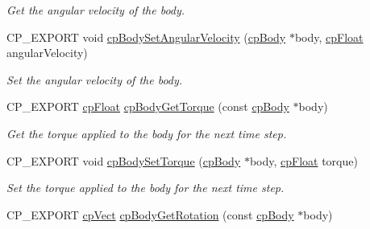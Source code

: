 \begin{DoxyCompactItemize}
\begin{DoxyCompactList}\small\item\em Get the angular velocity of the body. \end{DoxyCompactList}\item 
\mbox{\label{group__cp_body_gacc650639383006ae40657883b9ecf02d}} 
C\+P\+\_\+\+E\+X\+P\+O\+RT void \mbox{\hyperlink{group__cp_body_gacc650639383006ae40657883b9ecf02d}{cp\+Body\+Set\+Angular\+Velocity}} (\mbox{\hyperlink{structcp_body}{cp\+Body}} $\ast$body, \mbox{\hyperlink{group__basic_types_gac1ed65573e035bf892505768c852d8d3}{cp\+Float}} angular\+Velocity)
\begin{DoxyCompactList}\small\item\em Set the angular velocity of the body. \end{DoxyCompactList}\item 
\mbox{\label{group__cp_body_ga77bde17091dff1496e695fbba26037bb}} 
C\+P\+\_\+\+E\+X\+P\+O\+RT \mbox{\hyperlink{group__basic_types_gac1ed65573e035bf892505768c852d8d3}{cp\+Float}} \mbox{\hyperlink{group__cp_body_ga77bde17091dff1496e695fbba26037bb}{cp\+Body\+Get\+Torque}} (const \mbox{\hyperlink{structcp_body}{cp\+Body}} $\ast$body)
\begin{DoxyCompactList}\small\item\em Get the torque applied to the body for the next time step. \end{DoxyCompactList}\item 
\mbox{\label{group__cp_body_gade0bd4162880703b6e2f7a5de6a2fd0c}} 
C\+P\+\_\+\+E\+X\+P\+O\+RT void \mbox{\hyperlink{group__cp_body_gade0bd4162880703b6e2f7a5de6a2fd0c}{cp\+Body\+Set\+Torque}} (\mbox{\hyperlink{structcp_body}{cp\+Body}} $\ast$body, \mbox{\hyperlink{group__basic_types_gac1ed65573e035bf892505768c852d8d3}{cp\+Float}} torque)
\begin{DoxyCompactList}\small\item\em Set the torque applied to the body for the next time step. \end{DoxyCompactList}\item 
\mbox{\label{group__cp_body_ga064d1ba194075ebfe2b5aa45b56a800f}} 
C\+P\+\_\+\+E\+X\+P\+O\+RT \mbox{\hyperlink{structcp_vect}{cp\+Vect}} \mbox{\hyperlink{group__cp_body_ga064d1ba194075ebfe2b5aa45b56a800f}{cp\+Body\+Get\+Rotation}} (const \mbox{\hyperlink{structcp_body}{cp\+Body}} $\ast$body)

\end{DoxyCompactItemize}
